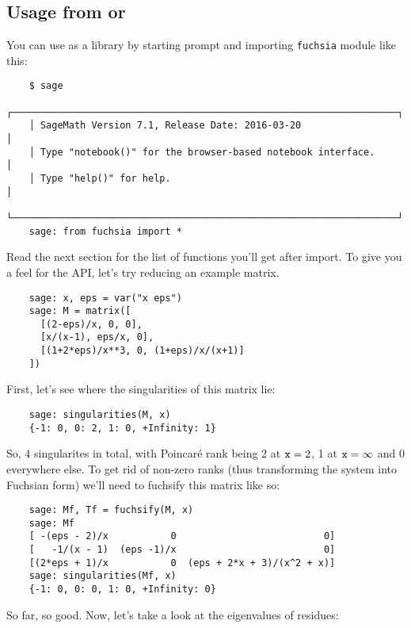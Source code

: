 \documentclass[12pt,a4paper]{article}
\begin{document}
\subsection{Usage from \sage or \python}
\label{sec:usage_py}

You can use \fuchsia as a library by starting \sage prompt and importing \texttt{fuchsia} module like this:

\begin{verbatim}
    $ sage
    ┌────────────────────────────────────────────────────────────────────┐
    │ SageMath Version 7.1, Release Date: 2016-03-20                     │
    │ Type "notebook()" for the browser-based notebook interface.        │
    │ Type "help()" for help.                                            │
    └────────────────────────────────────────────────────────────────────┘
    sage: from fuchsia import *
\end{verbatim}

Read the next section for the list of functions you'll get after import.
To give you a feel for the API, let's try reducing an example matrix.

\begin{verbatim}
    sage: x, eps = var("x eps")
    sage: M = matrix([
      [(2-eps)/x, 0, 0],
      [x/(x-1), eps/x, 0],
      [(1+2*eps)/x**3, 0, (1+eps)/x/(x+1)]
    ])
\end{verbatim}

First, let's see where the singularities of this matrix lie:

\begin{verbatim}
    sage: singularities(M, x)
    {-1: 0, 0: 2, 1: 0, +Infinity: 1}
\end{verbatim}

So, 4 singularites in total, with Poincar\'e rank being 2 at $\texttt{x}=2$, 1 at $\texttt{x}=\infty$ and 0 everywhere else.
To get rid of non-zero ranks (thus transforming the system into Fuchsian form) we'll need to fuchsify this matrix like so:

\begin{verbatim}
    sage: Mf, Tf = fuchsify(M, x)
    sage: Mf
    [ -(eps - 2)/x           0                          0]
    [   -1/(x - 1)  (eps -1)/x                          0]
    [(2*eps + 1)/x           0  (eps + 2*x + 3)/(x^2 + x)]
    sage: singularities(Mf, x)
    {-1: 0, 0: 0, 1: 0, +Infinity: 0}
\end{verbatim}

So far, so good. Now, let's take a look at the eigenvalues of  residues:
\end{document}
